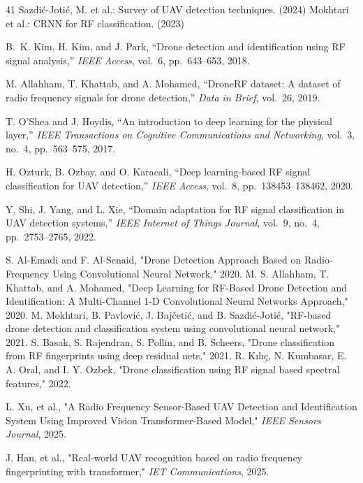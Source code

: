 \documentclass[runningheads]{llncs}
\begin{document}
\begin{thebibliography}{41}
 Sazdić-Jotić, M. et al.: Survey of UAV detection techniques. (2024)
 Mokhtari et al.: CRNN for RF classification. (2023)

B.~K. Kim, H. Kim, and J. Park,
``Drone detection and identification using RF signal analysis,''
\emph{IEEE Access}, vol.~6, pp.~643--653, 2018.

M. Allahham, T. Khattab, and A. Mohamed,
``DroneRF dataset: A dataset of radio frequency signals for drone detection,''
\emph{Data in Brief}, vol.~26, 2019.

T. O'Shea and J. Hoydis,
``An introduction to deep learning for the physical layer,''
\emph{IEEE Transactions on Cognitive Communications and Networking},
vol.~3, no.~4, pp.~563--575, 2017.

H. Ozturk, B. Ozbay, and O. Karacali,
``Deep learning-based RF signal classification for UAV detection,''
\emph{IEEE Access}, vol.~8, pp.~138453--138462, 2020.

Y. Shi, J. Yang, and L. Xie,
``Domain adaptation for RF signal classification in UAV detection systems,''
\emph{IEEE Internet of Things Journal}, vol.~9, no.~4, pp.~2753--2765, 2022.

 S. Al-Emadi and F. Al-Senaid, "Drone Detection Approach Based on Radio-Frequency Using Convolutional Neural Network," 2020.
 M. S. Allahham, T. Khattab, and A. Mohamed, "Deep Learning for RF-Based Drone Detection and Identification: A Multi-Channel 1-D Convolutional Neural Networks Approach," 2020.
 M. Mokhtari, B. Pavlović, J. Bajčetić, and B. Sazdić-Jotić, "RF-based drone detection and classification system using convolutional neural network," 2021.
 S. Basak, S. Rajendran, S. Pollin, and B. Scheers, "Drone classification from RF fingerprints using deep residual nets," 2021.
 R. Kılıç, N. Kumbasar, E. A. Oral, and I. Y. Ozbek, "Drone classification using RF signal based spectral features," 2022.

L. Xu, et al., "A Radio Frequency Sensor-Based UAV Detection and Identification System Using Improved Vision Transformer-Based Model," \emph{IEEE Sensors Journal}, 2025.

J. Han, et al., "Real-world UAV recognition based on radio frequency fingerprinting with transformer," \emph{IET Communications}, 2025.


\end{thebibliography}
\end{document}
